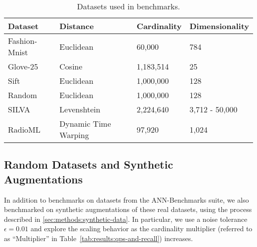 \begin{table}[!t]
    \caption{Datasets used in benchmarks.}
    \label{tab:datasets:summary}
    \vskip 0.15in
    \begin{center}
        \begin{small}
            \begin{sc}
                \begin{tabular}{|l|l|l|l|}
                    \hline
                    \textbf{Dataset} & \textbf{Distance}  &\textbf{Cardinality}  & \textbf{Dimensionality}  \\
                    \hline
                    Fashion-Mnist    & Euclidean              & 60,000             & 784                    \\
                    \hline
                    Glove-25         & Cosine                 & 1,183,514          & 25                     \\
                    \hline
                    Sift             & Euclidean              & 1,000,000          & 128                    \\
                    \hline
                    Random           & Euclidean              & 1,000,000          & 128                    \\
                    \hline
                    SILVA            & Levenshtein            & 2,224,640          & 3,712 - 50,000         \\
                    \hline
                    RadioML          & Dynamic Time Warping   & 97,920             & 1,024                  \\
                    \hline
                \end{tabular}
            \end{sc}
        \end{small}
    \end{center}
    \vskip -0.1in
\end{table}

\subsection{Random Datasets and Synthetic Augmentations}
\label{sec:datasets-and-benchmarks:random-datasets}

In addition to benchmarks on datasets from the ANN-Benchmarks suite, we also benchmarked on synthetic augmentations of these real datasets, using the process described in \ref{sec:methods:synthetic-data}. 
In particular, we use a noise tolerance $\epsilon = 0.01$ and explore the scaling behavior as the cardinality multiplier (referred to as ``Multiplier'' in Table~\ref{tab:results:qps-and-recall}) increases. 

